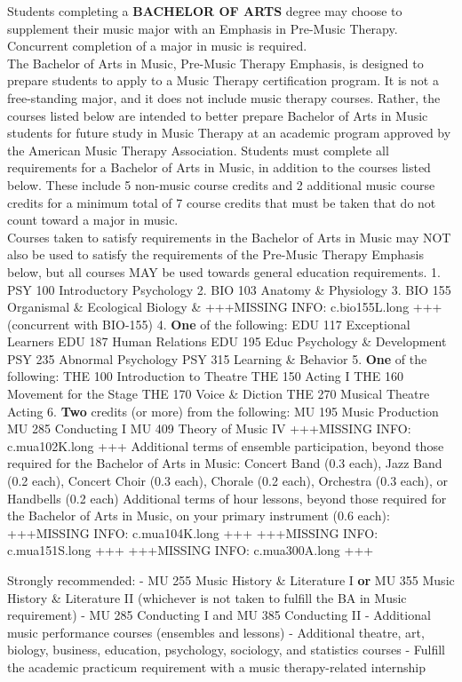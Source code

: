 \documentclass[
  letterpaper,
]{scrbook}
\begin{document}
Students completing a \textbf{BACHELOR OF ARTS} degree may choose to
supplement their music major with an Emphasis in Pre-Music Therapy.
Concurrent completion of a major in music is required.\\
The Bachelor of Arts in Music, Pre-Music Therapy Emphasis, is designed
to prepare students to apply to a Music Therapy certification program.
It is not a free-standing major, and it does not include music therapy
courses. Rather, the courses listed below are intended to better prepare
Bachelor of Arts in Music students for future study in Music Therapy at
an academic program approved by the American Music Therapy Association.
Students must complete all requirements for a Bachelor of Arts in Music,
in addition to the courses listed below. These include 5 non-music
course credits and 2 additional music course credits for a minimum total
of 7 course credits that must be taken that do not count toward a major
in music.\\
Courses taken to satisfy requirements in the Bachelor of Arts in Music
may NOT also be used to satisfy the requirements of the Pre-Music
Therapy Emphasis below, but all courses MAY be used towards general
education requirements. 1. PSY 100 Introductory Psychology 2. BIO 103
Anatomy \& Physiology 3. BIO 155 Organismal \& Ecological Biology \&
+++MISSING INFO: c.bio155L.long +++ (concurrent with BIO-155) 4.
\textbf{One} of the following: EDU 117 Exceptional Learners EDU 187
Human Relations EDU 195 Educ Psychology \& Development PSY 235 Abnormal
Psychology PSY 315 Learning \& Behavior 5. \textbf{One} of the
following: THE 100 Introduction to Theatre THE 150 Acting I THE 160
Movement for the Stage THE 170 Voice \& Diction THE 270 Musical Theatre
Acting 6. \textbf{Two} credits (or more) from the following: MU 195
Music Production MU 285 Conducting I MU 409 Theory of Music IV
+++MISSING INFO: c.mua102K.long +++ Additional terms of ensemble
participation, beyond those required for the Bachelor of Arts in Music:
Concert Band (0.3 each), Jazz Band (0.2 each), Concert Choir (0.3 each),
Chorale (0.2 each), Orchestra (0.3 each), or Handbells (0.2 each)
Additional terms of hour lessons, beyond those required for the Bachelor
of Arts in Music, on your primary instrument (0.6 each):\\
+++MISSING INFO: c.mua104K.long +++ +++MISSING INFO: c.mua151S.long +++
+++MISSING INFO: c.mua300A.long +++

Strongly recommended: - MU 255 Music History \& Literature I \textbf{or}
MU 355 Music History \& Literature II (whichever is not taken to fulfill
the BA in Music requirement) - MU 285 Conducting I and MU 385 Conducting
II - Additional music performance courses (ensembles and lessons) -
Additional theatre, art, biology, business, education, psychology,
sociology, and statistics courses - Fulfill the academic practicum
requirement with a music therapy-related internship
\end{document}
